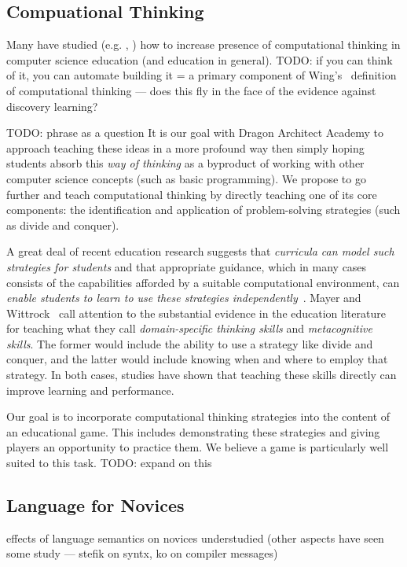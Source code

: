 \documentclass{sig-alternate}
\newcommand{\TODO}[1]{{\color{red} TODO: #1}}
\newcommand{\gametitle}{{\color{RoyalPurple} Dragon Architect Academy}}
\begin{document}
\subsection{Compuational Thinking}

Many have studied (e.g. \cite{repenning2010scalable}, \cite{barr2011bringing}) how to increase presence of computational thinking in computer science education (and education in general). \TODO{if you can think of it, you can automate building it = a primary component of Wing's~\cite{wing2008computational} definition of computational thinking --- does this fly in the face of the evidence against discovery learning?}

\TODO{phrase as a question}
It is our goal with \gametitle{} to approach teaching these ideas in a more profound way then simply hoping students absorb this \emph{way of thinking} as a byproduct of working with other computer science concepts (such as basic programming). We propose to go further and teach computational thinking by directly teaching one of its core components: the identification and application of problem-solving strategies (such as divide and conquer). 

A great deal of recent education research suggests that \emph{curricula can model such strategies for students} and that appropriate guidance, which in many cases consists of the capabilities afforded by a suitable computational environment, can \emph{enable students to learn to use these strategies independently}~\cite{report2010computational}. Mayer and Wittrock~\cite{mayer1996handbook} call attention to the substantial evidence in the education literature for teaching what they call \emph{domain-specific thinking skills} and \emph{metacognitive skills}. The former would include the ability to use a strategy like divide and conquer, and the latter would include knowing when and where to employ that strategy. In both cases, studies have shown that teaching these skills directly can improve learning and performance. 

Our goal is to incorporate computational thinking strategies into the content of an educational game. This includes demonstrating these strategies and giving players an opportunity to practice them. We believe a game is particularly well suited to this task. \TODO{expand on this}

\subsection{Language for Novices}
effects of language semantics on novices understudied (other aspects have seen some study --- stefik on syntx, ko on compiler messages)
\end{document}
